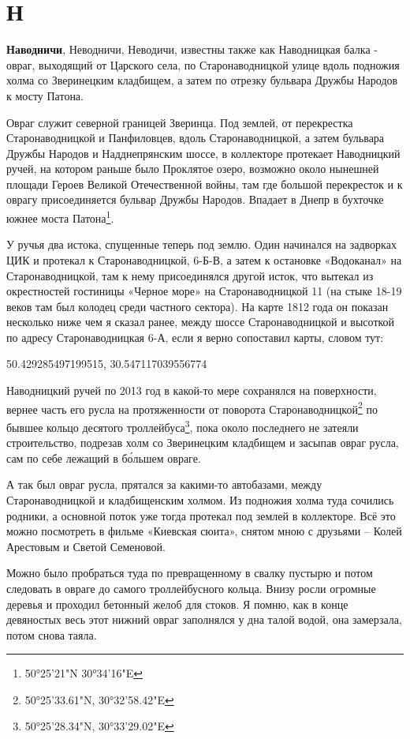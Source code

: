 \chapter*{Н}

\textbf{Наводничи}, Неводничи, Неводичи,  известны также как Наводницкая балка - овраг, выходящий от Царского села, по Старонаводницкой улице вдоль подножия холма со Зверинецким кладбищем, а затем по отрезку бульвара Дружбы Народов к мосту Патона. 

Овраг служит северной границей Зверинца. Под землей, от перекрестка Старонаводницкой и Панфиловцев, вдоль Старонаводницкой, а затем бульвара Дружбы Народов и Надднепрянским шоссе, в коллекторе протекает Наводницкий ручей, на котором раньше было Проклятое озеро, возможно около нынешней площади Героев Великой Отечественной войны, там где большой перекресток и к оврагу присоединяется бульвар Дружбы Народов. Впадает в Днепр в бухточке южнее моста Патона\footnote{50°25'21"N 30°34'16"E}.

У ручья два истока, спущенные теперь под землю. Один начинался на задворках ЦИК и протекал к Старонаводницкой, 6-Б-В, а затем к остановке «Водоканал» на Старонаводницкой, там к нему присоединялся другой исток, что вытекал из окрестностей гостиницы «Черное море» на Старонаводницкой 11 (на стыке 18-19 веков там был колодец среди частного сектора). На карте 1812 года он показан несколько ниже чем я сказал ранее, между шоссе Старонаводницкой и высоткой по адресу Старонаводницкая 6-А, если я верно сопоставил карты, словом тут:

50.429285497199515, 30.547117039556774

Наводницкий ручей по 2013 год в какой-то мере сохранялся на поверхности, вернее часть его русла на протяженности от поворота Старонаводницкой\footnote{50°25'33.61"N, 30°32'58.42"E} по бывшее кольцо десятого троллейбуса\footnote{ 50°25'28.34"N, 30°33'29.02"E}, пока около последнего не затеяли строительство, подрезав холм со Зверинецким кладбищем и засыпав овраг русла, сам по себе лежащий в б\'ольшем овраге. 

А так был овраг русла, прятался за какими-то автобазами, между Старонаводницкой и кладбищенским холмом. Из подножия холма туда сочились родники, а основной поток уже тогда протекал под землей в коллекторе. Всё это можно посмотреть в фильме «Киевская сюита», снятом мною с друзьями – Колей Арестовым и Светой Семеновой.

Можно было пробраться туда по превращенному в свалку пустырю и потом следовать в овраге до самого троллейбусного кольца. Внизу росли огромные деревья и проходил бетонный желоб для стоков. Я помню, как в конце девяностых весь этот нижний овраг заполнялся у дна талой водой, она замерзала, потом снова таяла.

